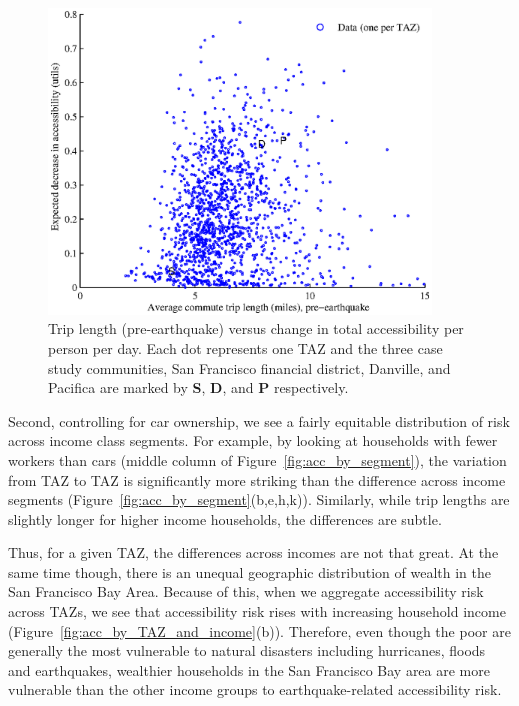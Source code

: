 %
\begin{figure}[h!]
\centering
\includegraphics[width=4in]{FIGS/equity_accLength2.eps} 
\caption{Trip length (pre-earthquake) versus change in total accessibility per person per day. Each dot represents one TAZ and the three case study communities, San Francisco financial district, Danville, and Pacifica are marked by \textbf{S}, \textbf{D}, and \textbf{P} respectively.}
\label{fig:accLength}
\end{figure}



Second, controlling for car ownership, we see a fairly equitable distribution of risk across income class segments.  For example, by looking at households with fewer workers than cars (middle column of Figure~\ref{fig:acc_by_segment}), the variation from TAZ to TAZ is significantly more striking than the difference across income segments (Figure~\ref{fig:acc_by_segment}{(b,e,h,k)}). Similarly, while trip lengths are slightly longer for higher income households, the differences are subtle. %


Thus, for a given TAZ, the differences across incomes are not that great. At the same time though, there is an unequal geographic distribution of wealth in the San Francisco Bay Area. Because of this, when we aggregate accessibility risk across TAZs, we see that accessibility risk rises with increasing household income  (Figure~\ref{fig:acc_by_TAZ_and_income}{(b)}). Therefore, even though the poor are generally the most vulnerable to natural disasters including hurricanes, floods and earthquakes,  wealthier households in the San Francisco Bay area are more vulnerable than the other income groups to earthquake-related accessibility risk.


